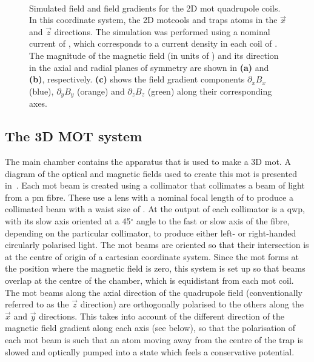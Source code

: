 \begin{figure}
	\centering
	\def\svgwidth{\columnwidth}
	\\
	\caption[Simulated field and field gradients for the 2D \ac{mot} quadrupole
		coils]{Simulated field and field gradients for the 2D \ac{mot}
		quadrupole coils. In this coordinate system, the 2D \ac{mot}cools and
		traps atoms in the \(\vec{x}\) and \(\vec{z}\) directions. The
		simulation was performed using a nominal current of
		, which corresponds to a current density in each
		coil of . The magnitude of
		the magnetic field (in units of \sivalue{}{\gauss}) and its direction in
		the axial and radial planes of symmetry are shown in \textbf{(a)} and
		\textbf{(b)}, respectively. \textbf{(c)} shows the field gradient
		components \(\partial_x B_x\) (blue), \(\partial_y B_y\) (orange) and
		\(\partial_z B_z\) (green) along their corresponding axes.}
	\label{fig:2d_mot_field_gradient}
\end{figure}
\subsection{The 3D MOT system}\label{sec:3d_mot}
The main chamber contains the apparatus that is used to make a 3D \ac{mot}. A
diagram of the optical and magnetic fields used to create this \ac{mot} is
presented in~. Each \ac{mot} beam is created using a
collimator that collimates a beam of light from a \ac{pm} fibre. These use a
lens with a nominal focal length of  to produce a collimated beam with a
waist size of . At the output of each
collimator is a \ac{qwp}, with its slow axis oriented at a 45\(^\circ\) angle to
the fast or slow axis of the fibre, depending on the particular collimator, to
produce either left- or right-handed circularly polarised light. The \ac{mot}
beams are oriented so that their intersection is at the centre of origin of a
cartesian coordinate system. Since the \ac{mot} forms at the position where the
magnetic field is zero, this system is set up so that beams overlap at the
centre of the chamber, which is equidistant from each \ac{mot} coil. The
\ac{mot} beams along the axial direction of the quadrupole field (conventionally
referred to as the \(\vec{z}\) direction) are orthogonally polarised to the
others along the \(\vec{x}\) and \(\vec{y}\) directions. This takes into account
of the different direction of the magnetic field gradient along each axis (see
below), so that the polarisation of each \ac{mot} beam is such that an atom
moving away from the centre of the trap is slowed and optically pumped into a
state which feels a conservative potential.
